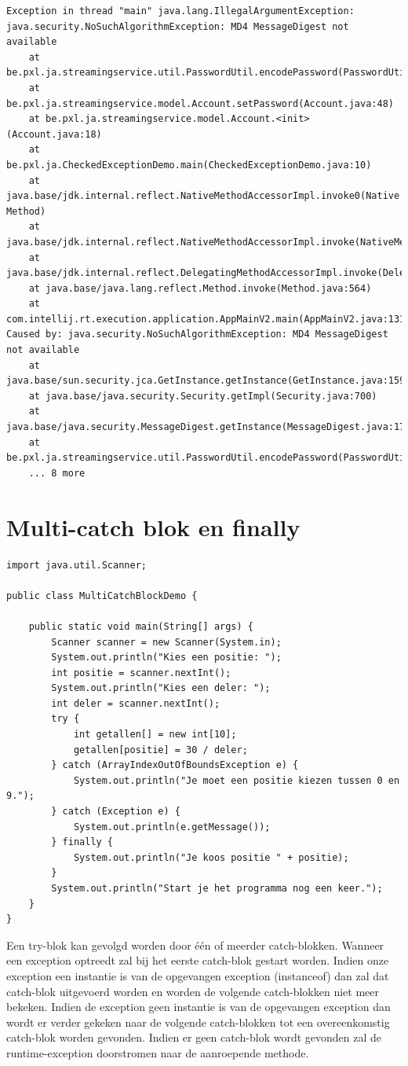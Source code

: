 \documentclass{tstextbook}
\begin{document}
\begin{verbatim}
Exception in thread "main" java.lang.IllegalArgumentException: java.security.NoSuchAlgorithmException: MD4 MessageDigest not available
	at be.pxl.ja.streamingservice.util.PasswordUtil.encodePassword(PasswordUtil.java:17)
	at be.pxl.ja.streamingservice.model.Account.setPassword(Account.java:48)
	at be.pxl.ja.streamingservice.model.Account.<init>(Account.java:18)
	at be.pxl.ja.CheckedExceptionDemo.main(CheckedExceptionDemo.java:10)
	at java.base/jdk.internal.reflect.NativeMethodAccessorImpl.invoke0(Native Method)
	at java.base/jdk.internal.reflect.NativeMethodAccessorImpl.invoke(NativeMethodAccessorImpl.java:62)
	at java.base/jdk.internal.reflect.DelegatingMethodAccessorImpl.invoke(DelegatingMethodAccessorImpl.java:43)
	at java.base/java.lang.reflect.Method.invoke(Method.java:564)
	at com.intellij.rt.execution.application.AppMainV2.main(AppMainV2.java:131)
Caused by: java.security.NoSuchAlgorithmException: MD4 MessageDigest not available
	at java.base/sun.security.jca.GetInstance.getInstance(GetInstance.java:159)
	at java.base/java.security.Security.getImpl(Security.java:700)
	at java.base/java.security.MessageDigest.getInstance(MessageDigest.java:177)
	at be.pxl.ja.streamingservice.util.PasswordUtil.encodePassword(PasswordUtil.java:15)
	... 8 more
\end{verbatim}

\section{Multi-catch blok en finally}

\begin{lstlisting}
import java.util.Scanner;

public class MultiCatchBlockDemo {

	public static void main(String[] args) {
		Scanner scanner = new Scanner(System.in);
		System.out.println("Kies een positie: ");
		int positie = scanner.nextInt();
		System.out.println("Kies een deler: ");
		int deler = scanner.nextInt();
		try {
			int getallen[] = new int[10];
			getallen[positie] = 30 / deler;
		} catch (ArrayIndexOutOfBoundsException e) {
			System.out.println("Je moet een positie kiezen tussen 0 en 9.");
		} catch (Exception e) {
			System.out.println(e.getMessage());
		} finally {
			System.out.println("Je koos positie " + positie);
		}
		System.out.println("Start je het programma nog een keer.");
	}
}
\end{lstlisting}

Een try-blok kan gevolgd worden door \'e\'en of meerder catch-blokken.
Wanneer een exception optreedt zal bij het eerste catch-blok gestart worden. Indien onze exception een instantie is van de opgevangen exception  (instanceof) dan zal dat catch-blok uitgevoerd worden en worden de volgende catch-blokken niet meer bekeken. Indien de exception geen instantie is van de opgevangen exception dan wordt er verder gekeken naar de volgende catch-blokken tot een overeenkomstig catch-blok worden gevonden. Indien er geen catch-blok wordt gevonden zal de runtime-exception doorstromen naar de aanroepende methode.
\end{document}
